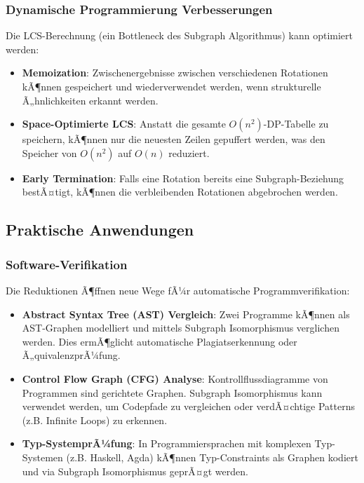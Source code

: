 ﻿\documentclass[a4paper,12pt]{article}
\theoremstyle{definition}
\begin{document}
\subsubsection{Dynamische Programmierung Verbesserungen}

Die LCS-Berechnung (ein Bottleneck des Subgraph Algorithmus) kann optimiert werden:

\begin{itemize}
	\item \textbf{Memoization}: Zwischenergebnisse zwischen verschiedenen Rotationen kÃ¶nnen gespeichert und wiederverwendet werden, wenn strukturelle Ã„hnlichkeiten erkannt werden.
	
	\item \textbf{Space-Optimierte LCS}: Anstatt die gesamte $O(n^2)$-DP-Tabelle zu speichern, kÃ¶nnen nur die neuesten Zeilen gepuffert werden, was den Speicher von $O(n^2)$ auf $O(n)$ reduziert.
	
	\item \textbf{Early Termination}: Falls eine Rotation bereits eine Subgraph-Beziehung bestÃ¤tigt, kÃ¶nnen die verbleibenden Rotationen abgebrochen werden.
\end{itemize}

\subsection{Praktische Anwendungen}

\subsubsection{Software-Verifikation}

Die Reduktionen Ã¶ffnen neue Wege fÃ¼r automatische Programmverifikation:

\begin{itemize}
	\item \textbf{Abstract Syntax Tree (AST) Vergleich}: Zwei Programme kÃ¶nnen als AST-Graphen modelliert und mittels Subgraph Isomorphismus verglichen werden. Dies ermÃ¶glicht automatische Plagiatserkennung oder Ã„quivalenzprÃ¼fung.
	
	\item \textbf{Control Flow Graph (CFG) Analyse}: Kontrollflussdiagramme von Programmen sind gerichtete Graphen. Subgraph Isomorphismus kann verwendet werden, um Codepfade zu vergleichen oder verdÃ¤chtige Patterns (z.B. Infinite Loops) zu erkennen.
	
	\item \textbf{Typ-SystemprÃ¼fung}: In Programmiersprachen mit komplexen Typ-Systemen (z.B. Haskell, Agda) kÃ¶nnen Typ-Constraints als Graphen kodiert und via Subgraph Isomorphismus geprÃ¤gt werden.
\end{itemize}
\end{document}
